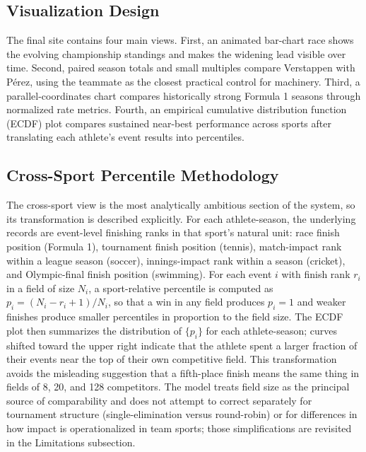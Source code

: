 \documentclass[conference]{IEEEtran}
\begin{document}
\subsection{Visualization Design}
The final site contains four main views. First, an animated bar-chart race shows the evolving championship standings and makes the widening lead visible over time. Second, paired season totals and small multiples compare Verstappen with P\'erez, using the teammate as the closest practical control for machinery. Third, a parallel-coordinates chart compares historically strong Formula 1 seasons through normalized rate metrics. Fourth, an empirical cumulative distribution function (ECDF) plot compares sustained near-best performance across sports after translating each athlete's event results into percentiles.

\subsection{Cross-Sport Percentile Methodology}\label{sec:methodology}
The cross-sport view is the most analytically ambitious section of the system, so its transformation is described explicitly. For each athlete-season, the underlying records are event-level finishing ranks in that sport's natural unit: race finish position (Formula 1), tournament finish position (tennis), match-impact rank within a league season (soccer), innings-impact rank within a season (cricket), and Olympic-final finish position (swimming). For each event $i$ with finish rank $r_i$ in a field of size $N_i$, a sport-relative percentile is computed as $p_i = (N_i - r_i + 1) / N_i$, so that a win in any field produces $p_i = 1$ and weaker finishes produce smaller percentiles in proportion to the field size. The ECDF plot then summarizes the distribution of $\{p_i\}$ for each athlete-season; curves shifted toward the upper right indicate that the athlete spent a larger fraction of their events near the top of their own competitive field. This transformation avoids the misleading suggestion that a fifth-place finish means the same thing in fields of 8, 20, and 128 competitors. The model treats field size as the principal source of comparability and does not attempt to correct separately for tournament structure (single-elimination versus round-robin) or for differences in how impact is operationalized in team sports; those simplifications are revisited in the Limitations subsection.
\end{document}
